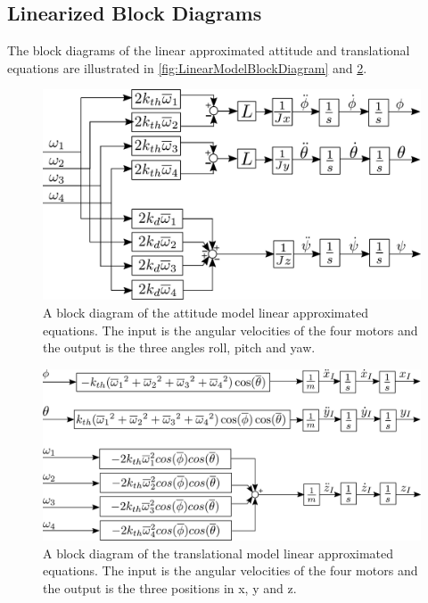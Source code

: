 \subsection{Linearized Block Diagrams}
The block diagrams of the linear approximated attitude and translational equations are illustrated in \autoref{fig:LinearModelBlockDiagram} and \ref{fig:TranslationalLinearModelBlockDiagram}.
\begin{figure}[H]
	\centering
	\includegraphics[scale=0.45]{figures/LinearModelBlockDiag.pdf}
	\caption{A block diagram of the attitude model linear approximated equations. The input is the angular velocities of the four motors and the output is the three angles roll, pitch and yaw.}
	\label{fig:LinearModelBlockDiagram}
\end{figure}
\begin{figure}[H]
	\centering
	\includegraphics[scale=0.45]{figures/TranslationalLinearModelBlockDiagram.pdf}
	\caption{A block diagram of the translational model linear approximated equations. The input is the angular velocities of the four motors and the output is the three positions in x, y and z.}
	\label{fig:TranslationalLinearModelBlockDiagram}
\end{figure}

